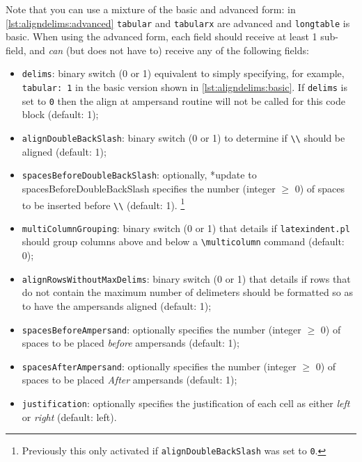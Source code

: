 	Note that you can use a mixture of the basic and advanced form: in \cref{lst:aligndelims:advanced} \texttt{tabular} and \texttt{tabularx} are advanced and \texttt{longtable} is basic.
	When using the advanced form, each field should receive at least 1 sub-field, and \emph{can} (but does not have to) receive any of the following fields: \begin{itemize} \item \texttt{delims}: binary switch (0 or 1) equivalent to simply specifying, for example, \texttt{tabular: 1} in the basic version shown in \cref{lst:aligndelims:basic}.
		      If \texttt{delims} is set to \texttt{0} then the align at ampersand routine will not be called for this code block (default: 1);
		\item \texttt{alignDoubleBackSlash}: binary switch (0 or 1) to determine if \lstinline!\\! should be aligned (default: 1);
		\item \texttt{spacesBeforeDoubleBackSlash}: optionally,%
		      *{update to spacesBeforeDoubleBackSlash} specifies the number (integer $\geq$ 0) of spaces to be inserted before \lstinline!\\! (default: 1).
		       \footnote{Previously this only activated if \texttt{alignDoubleBackSlash} was set to \texttt{0}.}%
		\item {}
		      \texttt{multiColumnGrouping}: binary switch (0 or 1) that details if \texttt{latexindent.pl} should group columns above and below a \lstinline!\multicolumn! command (default: 0);
		\item {} \texttt{alignRowsWithoutMaxDelims}: binary switch (0 or 1) that details if rows that do not contain the maximum number of delimeters should be formatted so as to have the ampersands aligned (default: 1);
		\item {}\texttt{spacesBeforeAmpersand}: optionally specifies the number (integer $\geq$ 0) of spaces to be placed \emph{before} ampersands (default: 1);
		\item {}\texttt{spacesAfterAmpersand}: optionally specifies the number (integer $\geq$ 0) of spaces to be placed \emph{After} ampersands (default: 1);
		\item {}\texttt{justification}: optionally specifies the justification of each cell as either \emph{left} or \emph{right} (default: left).
	\end{itemize}

